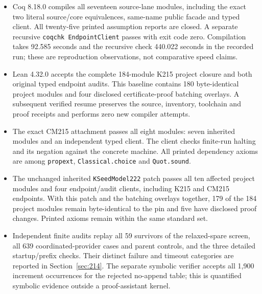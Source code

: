 \begin{itemize}
\item Coq 8.18.0 compiles all seventeen source-lane modules, including the
exact two literal source/core equivalences, same-name public facade and typed
client. All twenty-five printed assumption reports are closed. A separate
recursive \texttt{coqchk EndpointClient} passes with exit code zero.
Compilation takes 92.585 seconds and the recursive check 440.022 seconds in
the recorded run; these are reproduction observations, not comparative
speed claims.
\item Lean 4.32.0 accepts the complete 184-module K215 project closure and
both original typed endpoint audits. This baseline contains 180 byte-identical
project modules and four disclosed certificate-proof batching overlays.
A subsequent verified resume preserves the source, inventory, toolchain and
proof receipts and performs zero new compiler attempts.
\item The exact CM215 attachment passes all eight modules: seven inherited
modules and an independent typed client. The client checks finite-run halting
and its negation against the concrete machine. All printed dependency axioms
are among \texttt{propext}, \texttt{Classical.choice} and \texttt{Quot.sound}.
\item The unchanged inherited \texttt{KSeedModel222} patch passes all ten
affected project modules and four endpoint/audit clients, including K215 and
CM215 endpoints. With this patch and the batching overlays together, 179 of
the 184 project modules remain byte-identical to the pin and five have
disclosed proof changes. Printed axioms remain within the same standard set.
\item Independent finite audits replay all 59 survivors of the relaxed-spare
screen, all 639 coordinated-provider cases and parent controls, and the
three detailed startup/prefix checks. Their distinct failure and timeout
categories are reported in Section~\ref{sec:214}. The separate symbolic verifier accepts
all 1,900 increment occurrences for the rejected no-append table; this is
quantified symbolic evidence outside a proof-assistant kernel.
\end{itemize}
